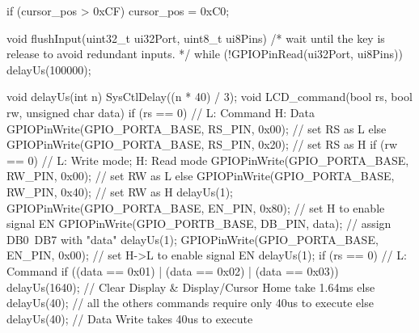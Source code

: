 \documentclass[12pt, a4paper]{article}
\begin{document}
\begin{code}
{{        if (cursor_pos > 0xCF) {
            cursor_pos = 0xC0;
        }
    }
}

void flushInput(uint32_t ui32Port, uint8_t ui8Pins)
{
    /* wait until the key is release to avoid redundant inputs. */
    while (!GPIOPinRead(ui32Port, ui8Pins))
    {
        delayUs(100000);
    }
}

void delayUs(int n)
{
    SysCtlDelay((n * 40) / 3);
}
void LCD_command(bool rs, bool rw, unsigned char data)
{
    if (rs == 0)                                     // L: Command H: Data
        GPIOPinWrite(GPIO_PORTA_BASE, RS_PIN, 0x00); // set RS as L
    else
        GPIOPinWrite(GPIO_PORTA_BASE, RS_PIN, 0x20); // set RS as H
    if (rw == 0)                                     // L: Write mode; H: Read mode
        GPIOPinWrite(GPIO_PORTA_BASE, RW_PIN, 0x00); // set RW as L
    else
        GPIOPinWrite(GPIO_PORTA_BASE, RW_PIN, 0x40); // set RW as H
    delayUs(1);
    GPIOPinWrite(GPIO_PORTA_BASE, EN_PIN, 0x80); // set H to enable signal EN
    GPIOPinWrite(GPIO_PORTB_BASE, DB_PIN, data); // assign DB0~DB7 with "data"
    delayUs(1);
    GPIOPinWrite(GPIO_PORTA_BASE, EN_PIN, 0x00); // set H->L to enable signal EN
    delayUs(1);
    if (rs == 0) // L: Command
    {
        if ((data == 0x01) | (data == 0x02) | (data == 0x03))
            delayUs(1640); // Clear Display & Display/Cursor Home take 1.64ms
        else
            delayUs(40); // all the others commands require only 40us to execute
    }
    else
        delayUs(40); // Data Write takes 40us to execute
}
\end{code}

\pagebreak
\end{document}
